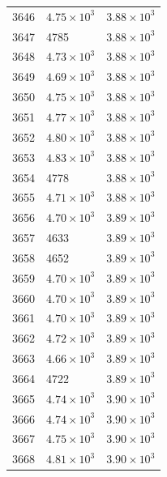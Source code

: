 \begin{table}[H]
\begin{tabular}{lll}
3646 & $\displaystyle 4.75 \times 10^{3}$ & $\displaystyle 3.88 \times 10^{3}$ \\
3647 & 4785 & $\displaystyle 3.88 \times 10^{3}$ \\
3648 & $\displaystyle 4.73 \times 10^{3}$ & $\displaystyle 3.88 \times 10^{3}$ \\
3649 & $\displaystyle 4.69 \times 10^{3}$ & $\displaystyle 3.88 \times 10^{3}$ \\
3650 & $\displaystyle 4.75 \times 10^{3}$ & $\displaystyle 3.88 \times 10^{3}$ \\
3651 & $\displaystyle 4.77 \times 10^{3}$ & $\displaystyle 3.88 \times 10^{3}$ \\
3652 & $\displaystyle 4.80 \times 10^{3}$ & $\displaystyle 3.88 \times 10^{3}$ \\
3653 & $\displaystyle 4.83 \times 10^{3}$ & $\displaystyle 3.88 \times 10^{3}$ \\
3654 & 4778 & $\displaystyle 3.88 \times 10^{3}$ \\
3655 & $\displaystyle 4.71 \times 10^{3}$ & $\displaystyle 3.88 \times 10^{3}$ \\
3656 & $\displaystyle 4.70 \times 10^{3}$ & $\displaystyle 3.89 \times 10^{3}$ \\
3657 & 4633 & $\displaystyle 3.89 \times 10^{3}$ \\
3658 & 4652 & $\displaystyle 3.89 \times 10^{3}$ \\
3659 & $\displaystyle 4.70 \times 10^{3}$ & $\displaystyle 3.89 \times 10^{3}$ \\
3660 & $\displaystyle 4.70 \times 10^{3}$ & $\displaystyle 3.89 \times 10^{3}$ \\
3661 & $\displaystyle 4.70 \times 10^{3}$ & $\displaystyle 3.89 \times 10^{3}$ \\
3662 & $\displaystyle 4.72 \times 10^{3}$ & $\displaystyle 3.89 \times 10^{3}$ \\
3663 & $\displaystyle 4.66 \times 10^{3}$ & $\displaystyle 3.89 \times 10^{3}$ \\
3664 & 4722 & $\displaystyle 3.89 \times 10^{3}$ \\
3665 & $\displaystyle 4.74 \times 10^{3}$ & $\displaystyle 3.90 \times 10^{3}$ \\
3666 & $\displaystyle 4.74 \times 10^{3}$ & $\displaystyle 3.90 \times 10^{3}$ \\
3667 & $\displaystyle 4.75 \times 10^{3}$ & $\displaystyle 3.90 \times 10^{3}$ \\
3668 & $\displaystyle 4.81 \times 10^{3}$ & $\displaystyle 3.90 \times 10^{3}$ \\

\end{tabular}
\end{table}
